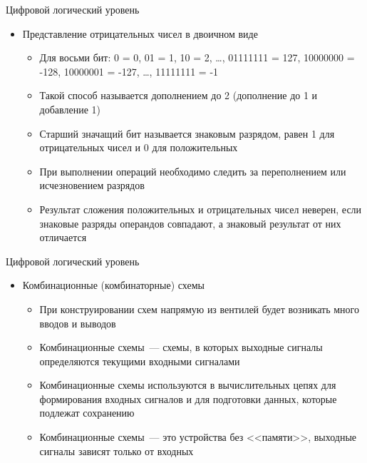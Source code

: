 \documentclass[aspectratio=169,14pt]{beamer}
\begin{document}
\begin{frame}{Цифровой логический уровень}
    \begin{itemize}
        \item Представление отрицательных чисел в двоичном виде
        \begin{footnotesize}
            \begin{itemize}
                \item Для восьми бит: 0 = 0, 01 = 1, 10 = 2, \ldots, 01111111 = 127,
                10000000 = -128, 10000001 = -127, \ldots, 11111111 = -1
                \item Такой способ называется дополнением до 2 (дополнение до 1 и добавление 1)
                \item Старший значащий бит называется знаковым разрядом, равен 1 для отрицательных
                чисел и 0 для положительных
                \item При выполнении операций необходимо следить за переполнением
                или исчезновением разрядов
                \item Результат сложения положительных и отрицательных чисел неверен,
                если знаковые разряды операндов совпадают, а знаковый результат от них отличается
            \end{itemize}
        \end{footnotesize}
\end{itemize}
\end{frame}

\begin{frame}{Цифровой логический уровень}
    \begin{itemize}
        \item Комбинационные (комбинаторные) схемы
        \begin{itemize}
            \item При конструировании схем напрямую из вентилей будет возникать много вводов и выводов
            \item Комбинационные схемы~--- схемы, в которых выходные сигналы
            определяются текущими входными сигналами
            \item Комбинационные схемы используются в вычислительных цепях для формирования входных
            сигналов и для подготовки данных, которые подлежат сохранению
            \item Комбинационные схемы~--- это устройства без <<памяти>>, выходные сигналы зависят
            только от входных
        \end{itemize}
    \end{itemize}
\end{frame}
\end{document}

